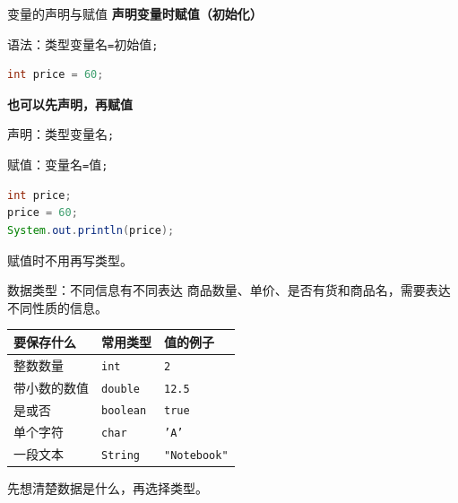 \documentclass[aspectratio=169]{beamer}
\begin{document}
\begin{frame}[fragile]{变量的声明与赋值}
  \textbf{声明变量时赋值（初始化）}
  \par
  语法：\quad 类型\quad 变量名\quad \texttt{=}\quad 初始值\texttt{;}
  \begin{lstlisting}[language=Java]
int price = 60;
  \end{lstlisting}
  \medskip
  \textbf{也可以先声明，再赋值}
  \par
  声明：\quad 类型\quad 变量名\texttt{;}
  \par
  赋值：\quad 变量名\quad \texttt{=}\quad 值\texttt{;}
  \begin{lstlisting}[language=Java]
int price;
price = 60;
System.out.println(price);
  \end{lstlisting}
  赋值时不用再写类型。
\end{frame}

\begin{frame}{数据类型：不同信息有不同表达}
  商品数量、单价、是否有货和商品名，需要表达不同性质的信息。
  \medskip
  \begin{center}
    \renewcommand{\arraystretch}{1.45}
    \begin{tabular}{lll}
      \textbf{要保存什么} & \textbf{常用类型} & \textbf{值的例子} \\
      \hline
      整数数量 & \texttt{int} & \texttt{2} \\
      带小数的数值 & \texttt{double} & \texttt{12.5} \\
      是或否 & \texttt{boolean} & \texttt{true} \\
      单个字符 & \texttt{char} & \texttt{'A'} \\
      一段文本 & \texttt{String} & \texttt{"Notebook"} \\
    \end{tabular}
  \end{center}
  \medskip
  \alert{先想清楚数据是什么，再选择类型。}
\end{frame}

\end{document}

